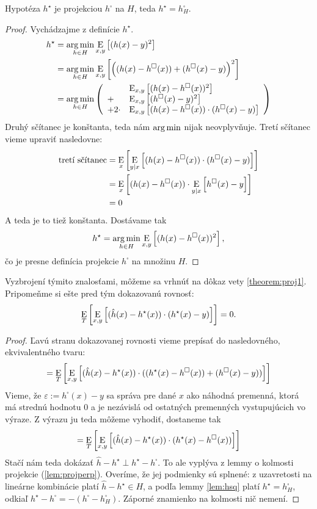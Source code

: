 \begin{lemma} \label{lem:hsq}
  Hypotéza $h^\star$ je projekciou $h^\square$ na $H$, teda $h^\star = h^\square_H$.
\end{lemma}
\begin{proof}
  Vychádzajme z definície $h^\star$.
  \begin{align}
    h^\star
      &= \operatorname*{arg\,min}_{h \in H} \operatorname*{\mathrm{E}}_{x,y} \left[ (h(x) - y)^2 \right] \\
      &= \operatorname*{arg\,min}_{h \in H} \operatorname*{\mathrm{E}}_{x,y} \left[ \left( (h(x) - h^\square(x)) + (h^\square(x) - y) \right)^2 \right] \\
      &= \operatorname*{arg\,min}_{h \in H} \left(
        \begin{array}{ll}
          &\operatorname*{\mathrm{E}}_{x,y} \left[ (h(x) - h^\square(x))^2 \right] \\
          + &\operatorname*{\mathrm{E}}_{x,y} \left[ (h^\square(x) - y)^2 \right] \\
          + 2 \cdot &\operatorname*{\mathrm{E}}_{x,y} \left[ (h(x) - h^\square(x)) \cdot (h^\square(x) - y) \right]
        \end{array}
        \right)
  \end{align}
  Druhý sčítanec je konštanta, teda nám $\operatorname*{arg\,min}$ nijak neovplyvňuje.
  Tretí sčítanec vieme upraviť nasledovne:
  \begin{align}
    \text{tretí sčítanec}
      &= \operatorname*{\mathrm{E}}_x \left[ \operatorname*{\mathrm{E}}_{y|x} \left[ (h(x) - h^\square(x)) \cdot (h^\square(x) - y) \right] \right] \\
      &= \operatorname*{\mathrm{E}}_x \left[ (h(x) - h^\square(x)) \cdot \operatorname*{\mathrm{E}}_{y|x} \left[ h^\square(x) - y \right] \right] \\
      &= 0
  \end{align}
  A teda je to tiež konštanta. Dostávame tak
  $$h^\star = \operatorname*{arg\,min}_{h \in H} \operatorname*{\mathrm{E}}_{x,y} \left[ (h(x) - h^\square(x))^2 \right],$$
  čo je presne definícia projekcie $h^\square$ na množinu $H$.
\end{proof}

Vyzbrojení týmito znalosťami, môžeme sa vrhnúť na dôkaz vety \ref{theorem:proj1}.
Pripomeňme si ešte pred tým dokazovanú rovnosť:
$$\operatorname*{\mathrm{E}}_T \left[ \operatorname*{\mathrm{E}}_{x, y} \left[ (\hat{h}(x) - h^\star(x)) \cdot (h^\star(x) - y) \right] \right] = 0.$$

\begin{proof}
  Ľavú stranu dokazovanej rovnosti vieme prepísať do nasledovného,
  ekvivalentného tvaru:
  $$ = \operatorname*{\mathrm{E}}_T \left[ \operatorname*{\mathrm{E}}_{x, y} \left[ (\hat{h}(x) - h^\star(x)) \cdot ((h^\star(x) - h^\square(x)) + (h^\square(x) - y)) \right] \right] $$
  Vieme, že $\varepsilon := h^\square(x) - y$ sa správa pre dané $x$
  ako náhodná premenná, ktorá má strednú hodnotu $0$ a je nezávislá
  od ostatných premenných vystupujúcich vo výraze. Z výrazu ju teda
  môžeme vyhodiť, dostaneme tak
  $$ = \operatorname*{\mathrm{E}}_T \left[ \operatorname*{\mathrm{E}}_{x, y} \left[ (\hat{h}(x) - h^\star(x)) \cdot (h^\star(x) - h^\square(x)) \right] \right] $$
  Stačí nám teda dokázať $\hat{h} - h^\star \perp h^\star - h^\square$.
  To ale vyplýva z lemmy o kolmosti projekcie (\ref{lem:projperp}).
  Overíme, že jej podmienky sú splnené: z uzavretosti na lineárne
  kombinácie platí $\hat{h} - h^\star \in H$, a podľa lemmy \ref{lem:hsq}
  platí $h^\star = h^\square_H$, odkiaľ
  $h^\star - h^\square = -(h^\square - h^\square_H)$.
  Záporné znamienko na kolmosti nič nemení.
\end{proof}

